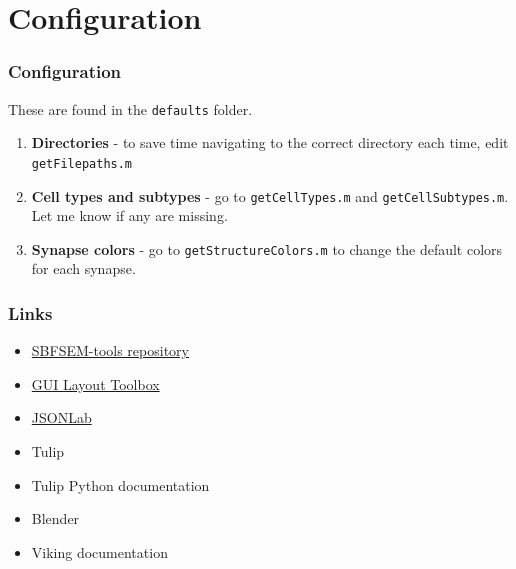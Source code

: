 \documentclass[11pt]{beamer}
\begin{document}
	\section{Configuration}
	\begin{frame}
		\frametitle{Configuration}
			These are found in the \texttt{defaults} folder.
			\begin{enumerate}
				\item \textbf{Directories} - to save time navigating to the correct directory each time, edit \texttt{getFilepaths.m}
				\item \textbf{Cell types and subtypes} - go to \texttt{getCellTypes.m} and \texttt{getCellSubtypes.m}. Let me know if any are missing.
				\item \textbf{Synapse colors} - go to \texttt{getStructureColors.m} to change the default colors for each synapse. 
			\end{enumerate}
	\end{frame}

\begin{frame}
	\frametitle{Links}
	\begin{itemize}
		\item \href{www.github.com/sarastokes/sbfsem-tools}{SBFSEM-tools repository}
		\item \href{https://www.mathworks.com/matlabcentral/fileexchange/47982-gui-layout-toolbox}{GUI Layout Toolbox}
		\item \href{https://www.mathworks.com/matlabcentral/fileexchange/33381-jsonlab--a-toolbox-to-encode-decode-json-files}{JSONLab}
		\item Tulip
		\item Tulip Python documentation
		\item Blender
		\item Viking documentation
	\end{itemize}
\end{frame}	
\end{document}
